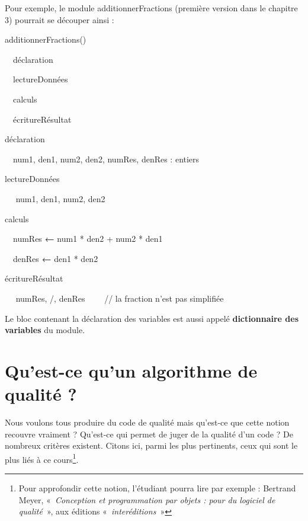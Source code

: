 {
Pour exemple, le module additionnerFractions (première version dans le
chapitre 3) pourrait se découper ainsi :}

{\sffamily
{}
additionnerFractions()}

{\sffamily
\ \ déclaration}

{\sffamily
\ \ lectureDonnées}

{\sffamily
\ \ calculs}

{\sffamily
\ \ écritureRésultat}

{\sffamily
{}}


\bigskip

{\sffamily
{} déclaration}

{\sffamily
{\ \ }{num1, den1,
num2, den2, numRes, denRes : entiers}}

{\sffamily
{}}


\bigskip

{\sffamily
{} lectureDonnées}

{\sffamily
\ \  num1, den1, num2, den2}

{\sffamily
{}}


\bigskip


\bigskip


\bigskip

{\sffamily
{} calculs}

{\sffamily
{\ \ numRes
}{\textbf{←}}{ num1 *
den2 + num2 * den1}}

{\sffamily
{\ \ denRes
}{\textbf{←}}{ den1 *
den2}}

{\sffamily
{}}


\bigskip

{\sffamily
{} écritureRésultat}

{\sffamily
\ \  numRes, {\textquotedbl}/{\textquotedbl},
denRes \ \ \ \ // la fraction n'est pas simplifiée}

{\sffamily
{}}

{
{Le bloc contenant la déclaration des variables
est aussi appelé }{\textbf{dictionnaire des
variables}}{ du module.}}

\section{Qu'est-ce qu'un algorithme de
qualité ?}
{
Nous voulons tous produire du code de qualité mais
qu'est-ce que cette notion recouvre vraiment ?
Qu'est-ce qui permet de juger de la qualité
d'un code ? De nombreux critères existent. Citons ici,
parmi les plus pertinents, ceux qui sont le plus liés à ce
cours\footnote{Pour approfondir cette notion,
l'étudiant pourra lire par exemple : Bertrand Meyer,
«~\textit{Conception et programmation par objets : pour du logiciel de
qualité}~», aux éditions «\textit{~interéditions~}»}. }


